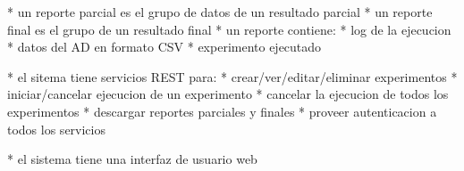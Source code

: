 * un reporte parcial es el grupo de datos de un resultado parcial
* un reporte final es el grupo de un resultado final
* un reporte contiene:
    * log de la ejecucion
    * datos del AD en formato CSV
    * experimento ejecutado

* el sitema tiene servicios REST para:
    * crear/ver/editar/eliminar experimentos
    * iniciar/cancelar ejecucion de un experimento
    * cancelar la ejecucion de todos los experimentos
    * descargar reportes parciales y finales
    * proveer autenticacion a todos los servicios

* el sistema tiene una interfaz de usuario web
\newpage